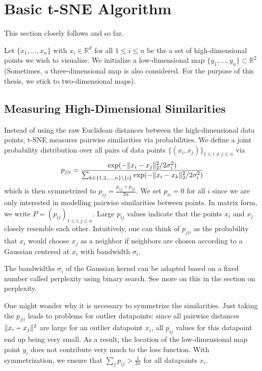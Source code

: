 \section{Basic t-SNE Algorithm}
This section closely follows \cite{Cai22} and \cite{vdMaa08} so far. 

Let $\{x_1, \dots , x_n \}$ with $x_i \in \mathbb{R}^d$ for all $1 \leq i \leq n$ be the a set of high-dimensional points we wish to visualize.
We initialize a low-dimensional map $\{y_1, \dots , y_n\} \subset \mathbb{R}^2$ (Sometimes, a three-dimensional map is also considered. For the purpose of this thesis, we stick to two-dimensional maps). 

\subsection{Measuring High-Dimensional Similarities}

Instead of using the raw Euclidean distances between the high-dimensional data points, t-SNE measures pairwise similarities via probabilities. 
We define a joint probability distribution over all pairs of data points $\{(x_i, x_j)\}_{1 \leq i \neq j \leq n}$ via  
\begin{equation}
    p_{j|i} =  \frac{\exp(-\lVert x_i - x_j\rVert_2^2 / 2\sigma_i^2)}{\sum_{k \in \{1,2, \dots, n\} \backslash \{i\}} \exp({-\lVert x_i - x_k\rVert_2^2 / 2 \sigma_i^2})}
\end{equation}
which is then symmetrized to $p_{ij} = \frac{p_{i|j} + p_{j|i}}{2n}$. We set $p_{ii}=0$ for all $i$ since we are only interested in modelling pairwise similarities between points. In matrix form, we write $P = (p_{ij})_{1 \leq i, j \leq n}$. 
Large $p_{ij}$ values indicate that the points $x_i$ and $x_j$ closely resemble each other. 
Intuitively, one can think of $p_{j|i}$ as the probability that $x_i$ would choose $x_j$ as a neighbor if neighbors are chosen according to a Gaussian centered at $x_i$ with bandwidth $\sigma_i$. 

The bandwidths $\sigma_i$ of the Gaussian kernel can be adapted based on a fixed number called perplexity using binary search. See more on this in the section on perplexity. 

One might wonder why it is necessary to symmetrize the similarities. Just taking the $p_{j|i}$ leads to problems for outlier datapoints: since all pairwise distances $\lVert x_i - x_j\rVert^2$ are large for an outlier datapoint $x_i$, all $p_{ij}$ values for this datapoint end up being very small. 
As a result, the location of the low-dimensional map point $y_i$ does not contribute very much to the loss function. With symmetrization, we ensure that $\sum_{j} p_{ij} > \frac{1}{2n}$ for all datapoints $x_i$. 

